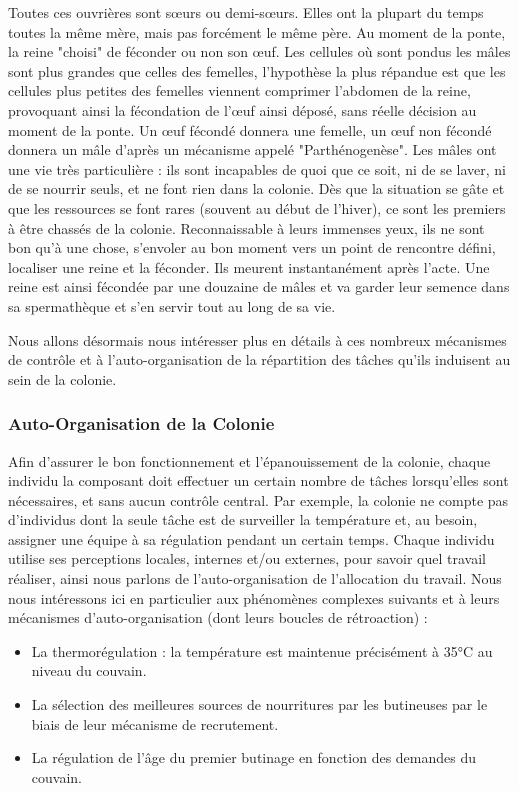 			Toutes ces ouvrières sont sœurs ou demi-sœurs. Elles ont la plupart du temps toutes la même mère, mais pas forcément le même père. Au moment de la ponte, la reine "choisi" de féconder ou non son œuf. Les cellules où sont pondus les mâles sont plus grandes que celles des femelles, l'hypothèse la plus répandue est que les cellules plus petites des femelles viennent comprimer l'abdomen de la reine, provoquant ainsi la fécondation de l'œuf ainsi déposé, sans réelle décision au moment de la ponte. Un œuf fécondé donnera une femelle, un œuf non fécondé donnera un mâle d'après un mécanisme appelé "Parthénogenèse". 
			Les mâles ont une vie très particulière : ils sont incapables de quoi que ce soit, ni de se laver, ni de se nourrir seuls, et ne font rien dans la colonie. Dès que la situation se gâte et que les ressources se font rares (souvent au début de l'hiver), ce sont les premiers à être chassés de la colonie. Reconnaissable à leurs immenses yeux, ils ne sont bon qu'à une chose, s'envoler au bon moment vers un point de rencontre défini, localiser une reine et la féconder. Ils meurent instantanément après l'acte. Une reine est ainsi fécondée par une douzaine de mâles et va garder leur semence dans sa spermathèque et s'en servir tout au long de sa vie.
			
			Nous allons désormais nous intéresser plus en détails à ces nombreux mécanismes de contrôle et à l'auto-organisation de la répartition des tâches qu'ils induisent au sein de la colonie.
			
		\subsubsection{Auto-Organisation de la Colonie}
			Afin d'assurer le bon fonctionnement et l'épanouissement de la colonie, chaque individu la composant doit effectuer un certain nombre de tâches lorsqu'elles sont nécessaires, et sans aucun contrôle central. Par exemple, la colonie ne compte pas d'individus dont la seule tâche est de surveiller la température et, au besoin, assigner une équipe à sa régulation pendant un certain temps. Chaque individu utilise ses perceptions locales, internes et/ou externes, pour savoir quel travail réaliser, ainsi nous parlons de l'auto-organisation de l'allocation du travail. Nous nous intéressons ici en particulier aux phénomènes complexes suivants et à leurs mécanismes d'auto-organisation (dont leurs boucles de rétroaction) :
			
			
			\begin{itemize}
				\item La thermorégulation : la température est maintenue précisément à 35°C au niveau du couvain.
				\item La sélection des meilleures sources de nourritures par les butineuses par le biais de leur mécanisme de recrutement.
				\item La régulation de l'âge du premier butinage en fonction des demandes du couvain.
			\end{itemize}

